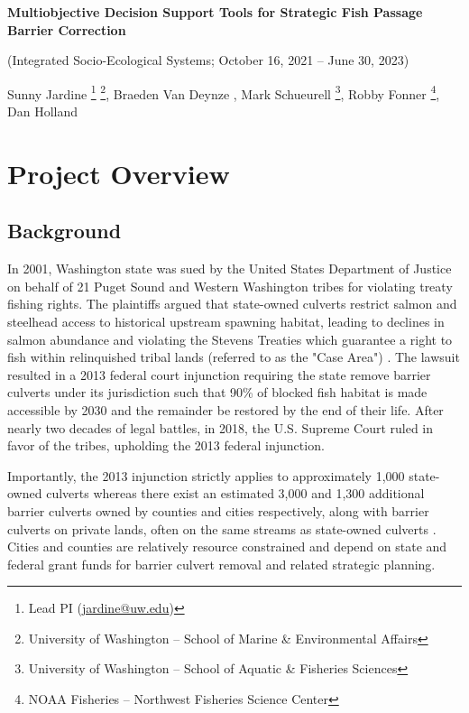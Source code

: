 \documentclass[12pt]{elsarticle}
\begin{document}
	
\begin{center}
		\textbf{Multiobjective Decision Support Tools for Strategic Fish Passage Barrier Correction}
		
		(Integrated Socio-Ecological Systems; October 16, 2021 -- June 30, 2023)

		\vspace{0.1cm}
		Sunny Jardine \footnote{Lead PI (\url{jardine@uw.edu})} \footnote{University of Washington -- School of Marine \& Environmental Affairs}, Braeden Van Deynze \footnotemark[2], Mark Schueurell \footnote{University of Washington -- School of Aquatic \& Fisheries Sciences}, Robby Fonner \footnote{NOAA Fisheries -- Northwest Fisheries Science Center}, Dan Holland \footnotemark[4]
\end{center}

	
	\section{Project Overview}
	\subsection{Background} 
	In 2001, Washington state was sued by the United States Department of Justice on behalf of 21 Puget Sound and Western Washington tribes for violating treaty fishing rights. The plaintiffs argued that state-owned culverts restrict salmon and steelhead access to historical upstream spawning habitat, leading to declines in salmon abundance and violating the Stevens Treaties which guarantee a right to fish within relinquished tribal lands (referred to as the "Case Area") \citep{hickey_highway_2018}. The lawsuit resulted in a 2013 federal court injunction requiring the state remove barrier culverts under its jurisdiction such that 90\% of blocked fish habitat is made accessible by 2030 and the remainder be restored by the end of their life. After nearly two decades of legal battles, in 2018, the U.S. Supreme Court ruled in favor of the tribes, upholding the 2013 federal injunction. 
	
	Importantly, the 2013 injunction strictly applies to approximately 1,000 state-owned culverts whereas there exist an estimated 3,000 and 1,300 additional barrier culverts owned by counties and cities respectively, along with barrier culverts on private lands, often on the same streams as state-owned culverts \citep{brown_coming_2019}. Cities and counties are relatively resource constrained and depend on state and federal grant funds for barrier culvert removal and related strategic planning. 
	
\end{document}
